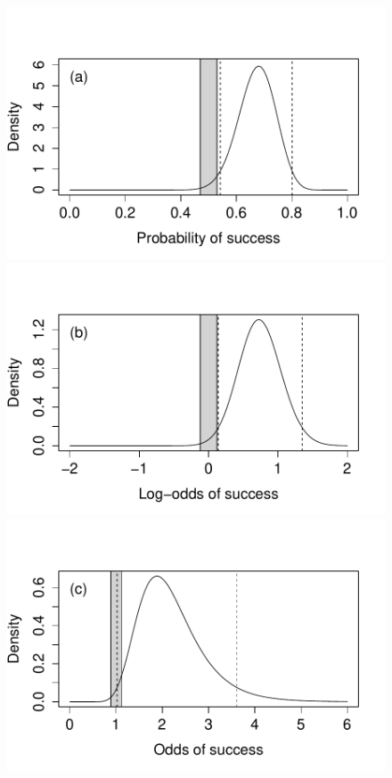 \documentclass[9pt,twocolumn,twoside]{cidlab-draft}\templatetype{cidlab-invited}
\begin{document}
\begin{figure}[tb]
    \centering
    \includegraphics[trim=0 15 30 40,clip,scale=.4]{p/figure1a.pdf}
    \includegraphics[trim=25 15 30 40,clip,scale=.4]{p/figure1b.pdf}
    \includegraphics[trim=25 15 30 40,clip,scale=.4]{p/figure1c.pdf}

\end{figure}
\end{document}
